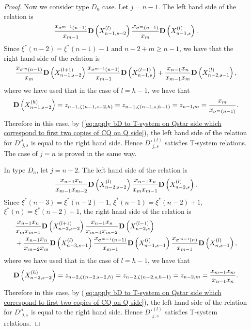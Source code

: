 \documentclass[12pt]{amsart}
\theoremstyle{plain}
\theoremstyle{definition}
\numberwithin{equation}{section}
\begin{document}
\begin{proof}
Now we consider type $D_n$ case. Let $j=n-1$. The left hand side of the relation is 
\begin{align*}
\frac{x_{\sigma^{m-1}(n-1)}}{x_{m-1}} {\bf D}\left( X_{n-1,s-2}^{(l)} \right) \frac{x_{\sigma^{m}(n-1)}}{x_{m}} {\bf D}\left( X_{n-1,s}^{(l)} \right).
\end{align*}
Since $\xi^*(n-2) = \xi^*(n-1)-1$ and $n-2+m \ge n-1$, we have that the right hand side of the relation is
\begin{align*}
\frac{x_{\sigma^m(n-1)}}{x_{m}} {\bf D}\left( X_{n-1,s-2}^{(l+1)} \right) \frac{x_{\sigma^{m-1}(n-1)}}{x_{m-1}} {\bf D}\left( X_{n-1,s}^{(l-1)} \right) + \frac{x_{n-1}x_n}{x_{m-1}x_m} {\bf D}\left( X_{n-2,s-1}^{(l)} \right),
\end{align*}
where we have used that in the case of $l=h-1$, we have that 
\[
{\bf D}\left( X_{n-1,s-2}^{(h)}\right) = z_{n-1, \zeta(n-1,s-2,h)} = z_{n-1, \zeta(n-1, s, h-1)} = z_{n-1, m} = \frac{x_m}{x_{\sigma^m(n-1)}}.  
\]
Therefore in this case, by (\ref{eq:apply bD to T-system on Qstar side which correspond to first two copies of CQ on Q side}), the left hand side of the relation for ${D'}_{j,s}^{l}$ is equal to the right hand side. Hence ${D'}_{j,s}^{(l)}$ satisfies T-system relations. The case of $j=n$ is proved in the same way. 

In type $D_n$, let $j=n-2$. The left hand side of the relation is
\begin{align*}
\frac{x_{n-1}x_n}{x_{m-1}x_{m-2}} {\bf D}\left( X_{n-2,s-2}^{(l)} \right) \frac{x_{n-1}x_n}{x_{m}x_{m-1}} {\bf D}\left( X_{n-2,s}^{(l)} \right). 
\end{align*}
Since $\xi^*(n-3) = \xi^*(n-2)-1$, $\xi^*(n-1) = \xi^*(n-2)+1$, $\xi^*(n) = \xi^*(n-2)+1$, the right hand side of the relation is
\begin{align*}
&  \frac{x_{n-1}x_n}{x_{m}x_{m-1}} {\bf D}\left( X_{n-2,s-2}^{(l+1)} \right) \frac{x_{n-1}x_n}{x_{m-1}x_{m-2}}  {\bf D}\left( X_{n-2,s}^{(l-1)} \right) \\
& +   \frac{x_{n-1}x_n}{x_{m-2}x_m} {\bf D}\left( X_{n-3,s-1}^{(l)} \right) \frac{x_{\sigma^{m-1}(n-1)}}{x_{m-1}} {\bf D}\left( X_{n-1,s-1}^{(l)} \right) \frac{x_{\sigma^{m-1}(n)}}{x_{m-1}} {\bf D}\left( X_{n,s-1}^{(l)} \right),
\end{align*}
where we have used that in the case of $l=h-1$, we have that 
\begin{align*}
{\bf D}\left( X_{n-2,s-2}^{(h)} \right) = z_{n-2,\zeta(n-2,s-2,h)} = z_{n-2,\zeta(n-2,s,h-1)} = z_{n-2, m} = \frac{x_{m-1}x_m}{x_{n-1}x_n}.  
\end{align*}
Therefore in this case, by (\ref{eq:apply bD to T-system on Qstar side which correspond to first two copies of CQ on Q side}), the left hand side of the relation for ${D'}_{j,s}^{l}$ is equal to the right hand side. Hence ${D'}_{j,s}^{(l)}$ satisfies T-system relations.


\end{proof}
\end{document}
